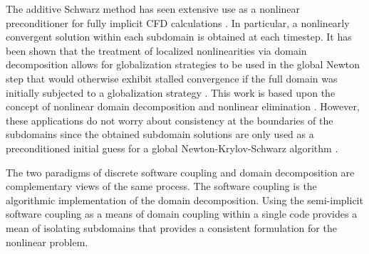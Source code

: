 The additive Schwarz method has seen extensive use as a nonlinear preconditioner for fully implicit CFD calculations \cite{Cai2009, Cai2002}.
In particular, a nonlinearly convergent solution within each subdomain is obtained at each timestep.
It has been shown that the treatment of localized nonlinearities via domain decomposition allows for globalization strategies to be used in the global Newton step that would otherwise exhibit stalled convergence if the full domain was initially subjected to a globalization strategy \cite{Cai2011}.
This work is based upon the concept of nonlinear domain decomposition and nonlinear elimination \cite{Lanzkron1996, Dryja1997}.
However, these applications do not worry about consistency at the boundaries of the subdomains since the obtained subdomain solutions are only used as a preconditioned initial guess for a global Newton-Krylov-Schwarz algorithm \cite{Chan1984}.

The two paradigms of discrete software coupling and domain decomposition are complementary views of the same process.
The software coupling is the algorithmic implementation of the domain decomposition.
Using the semi-implicit software coupling as a means of domain coupling within a single code provides a mean of isolating subdomains that provides a consistent formulation for the nonlinear problem.
